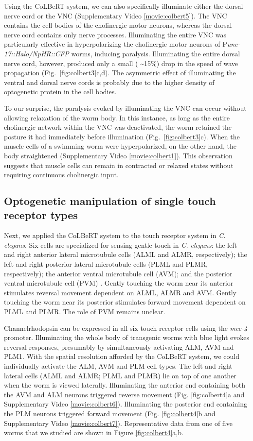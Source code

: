 Using the CoLBeRT system, we can also specifically illuminate either the dorsal nerve cord or the VNC (Supplementary Video \ref{movie:colbert5}). The VNC contains the cell bodies of the cholinergic motor neurons, whereas the dorsal nerve cord contains only nerve processes. Illuminating the entire VNC was particularly effective in hyperpolarizing the cholinergic motor neurons of P\textit{unc-17::Halo/NpHR::CFP} worms, inducing paralysis. Illuminating the entire dorsal nerve cord, however, produced only a small ( \textasciitilde15\%) drop in the speed of wave propagation (Fig.~\ref{fig:colbert3}c,d). The asymmetric effect of illuminating the ventral and dorsal nerve cords is probably due to the higher density of optogenetic protein in the cell bodies.

To our surprise, the paralysis evoked by illuminating the VNC can occur without allowing relaxation of the worm body. In this instance, as long as the entire cholinergic network within the VNC was deactivated, the worm retained the posture it had immediately before illumination (Fig.~\ref{fig:colbert3}c). When the muscle cells of a swimming worm were hyperpolarized, on the other hand, the body straightened (Supplementary Video \ref{movie:colbert1}). This observation suggests that muscle cells can remain in contracted or relaxed states without requiring continuous cholinergic input.


\subsection{Optogenetic manipulation of single touch receptor types}
Next, we applied the CoLBeRT system to the touch receptor system in \textit{C. elegans}. Six cells are specialized for sensing gentle touch in \textit{C. elegans}: the left and right anterior lateral microtubule cells (ALML and ALMR, respectively); the left and right posterior lateral microtubule cells (PLML and PLMR, respectively); the anterior ventral microtubule cell (AVM); and the posterior ventral microtubule cell (PVM) \citep{chalfie_neural_1985}. Gently touching the worm near its anterior stimulates reversal movement dependent on ALML, ALMR and AVM. Gently touching the worm near its posterior stimulates forward movement dependent on PLML and PLMR. The role of PVM remains unclear.

Channelrhodopsin can be expressed in all six touch receptor cells using the \textit{mec-4} promoter. Illuminating the whole body of transgenic worms with blue light evokes reversal responses, presumably by simultaneously activating ALM, AVM and PLM1. With the spatial resolution afforded by the CoLBeRT system, we could individually activate the ALM, AVM and PLM cell types. The left and right lateral cells (ALML and ALMR; PLML and PLMR) lie on top of one another when the worm is viewed laterally. Illuminating the anterior end containing both the AVM and ALM neurons triggered reverse movement (Fig. \ref{fig:colbert4}a and Supplementary Video \ref{movie:colbert6}). Illuminating the posterior end containing the PLM neurons triggered forward movement (Fig. \ref{fig:colbert4}b and Supplementary Video \ref{movie:colbert7}). Representative data from one of five worms that we studied are shown in Figure \ref{fig:colbert4}a,b.



